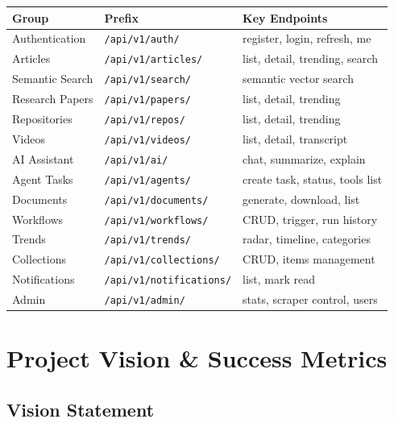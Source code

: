 \documentclass[12pt,a4paper]{report}
\begin{document}
\begin{center}
\begin{tabular}{lll}
\toprule
\textbf{Group} & \textbf{Prefix} & \textbf{Key Endpoints} \\
\midrule
Authentication   & \texttt{/api/v1/auth/}          & register, login, refresh, me \\
Articles         & \texttt{/api/v1/articles/}      & list, detail, trending, search \\
Semantic Search  & \texttt{/api/v1/search/}        & semantic vector search \\
Research Papers  & \texttt{/api/v1/papers/}        & list, detail, trending \\
Repositories     & \texttt{/api/v1/repos/}         & list, detail, trending \\
Videos           & \texttt{/api/v1/videos/}        & list, detail, transcript \\
AI Assistant     & \texttt{/api/v1/ai/}            & chat, summarize, explain \\
Agent Tasks      & \texttt{/api/v1/agents/}        & create task, status, tools list \\
Documents        & \texttt{/api/v1/documents/}     & generate, download, list \\
Workflows        & \texttt{/api/v1/workflows/}     & CRUD, trigger, run history \\
Trends           & \texttt{/api/v1/trends/}        & radar, timeline, categories \\
Collections      & \texttt{/api/v1/collections/}   & CRUD, items management \\
Notifications    & \texttt{/api/v1/notifications/} & list, mark read \\
Admin            & \texttt{/api/v1/admin/}         & stats, scraper control, users \\
\bottomrule
\end{tabular}
\end{center}

\chapter{Project Vision \& Success Metrics}

\section{Vision Statement}
\end{document}
